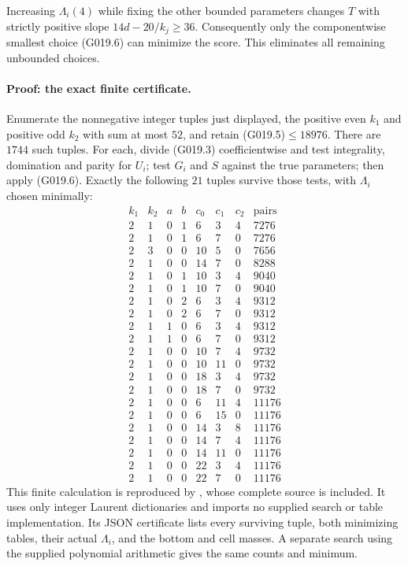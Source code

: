 Increasing $\Lambda_i(4)$ while fixing the other bounded
parameters changes $T$ with strictly positive slope
$14d-20/k_j\ge36$. Consequently only the componentwise
smallest choice (G019.6) can minimize the score. This
eliminates all remaining unbounded choices.

\paragraph{Proof: the exact finite certificate.}
Enumerate the nonnegative integer tuples just displayed,
the positive even $k_1$ and positive odd $k_2$ with sum
at most $52$, and retain (G019.5)$\le18976$. There are
$1744$ such tuples. For each, divide (G019.3) coefficientwise
and test integrality, domination and parity for $U_i$;
test $G_i$ and $S$ against the true parameters; then apply
(G019.6). Exactly the following $21$ tuples survive those
tests, with $\Lambda_i$ chosen minimally:
\[
\begin{array}{rr|rr|rrr|r}
k_1&k_2&a&b&c_0&c_1&c_2&\text{pairs}\\\hline
2&1&0&1&6&3&4&7276\\
2&1&0&1&6&7&0&7276\\
2&3&0&0&10&5&0&7656\\
2&1&0&0&14&7&0&8288\\
2&1&0&1&10&3&4&9040\\
2&1&0&1&10&7&0&9040\\
2&1&0&2&6&3&4&9312\\
2&1&0&2&6&7&0&9312\\
2&1&1&0&6&3&4&9312\\
2&1&1&0&6&7&0&9312\\
2&1&0&0&10&7&4&9732\\
2&1&0&0&10&11&0&9732\\
2&1&0&0&18&3&4&9732\\
2&1&0&0&18&7&0&9732\\
2&1&0&0&6&11&4&11176\\
2&1&0&0&6&15&0&11176\\
2&1&0&0&14&3&8&11176\\
2&1&0&0&14&7&4&11176\\
2&1&0&0&14&11&0&11176\\
2&1&0&0&22&3&4&11176\\
2&1&0&0&22&7&0&11176
\end{array}
\]
This finite calculation is reproduced by
, whose complete
source is included. It uses only integer Laurent dictionaries
and imports no supplied search or table implementation. Its
JSON certificate lists every surviving tuple, both minimizing
tables, their actual $\Lambda_i$, and the bottom and cell
masses. A separate search using the supplied polynomial
arithmetic gives the same counts and minimum.

